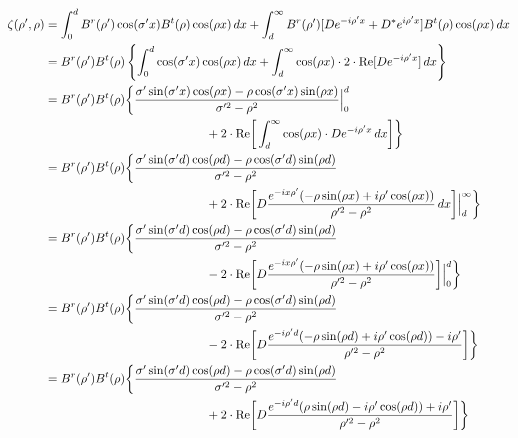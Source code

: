 \documentclass[11pt, oneside]{article}   	%
\begin{document}
\begin{align*}
\zeta(\rho ',\rho) &= \int_{0}^{d} B^{r}(\rho ')\cos(\sigma 'x) B^{t}(\rho)\cos(\rho x) \, dx + \int_{d}^{\infty} B^{r}(\rho ')[De^{-i\rho 'x} + D^{*}e^{i\rho 'x}] B^{t}(\rho)\cos(\rho x) \, dx \\
&= B^{r}(\rho ') B^{t}(\rho) \left\{ \int_{0}^{d} \cos(\sigma 'x) \cos(\rho x) \, dx + \int_{d}^{\infty} \cos(\rho x) \cdot 2 \cdot \text{Re}[De^{-i\rho 'x}] \, dx \right\} \\
&= B^{r}(\rho ') B^{t}(\rho) \bigg\{ \frac{\sigma '\sin(\sigma 'x) \cos(\rho x) - \rho\cos(\sigma 'x) \sin(\rho x)}{\sigma '^{2}-\rho^{2}} \Big|_{0}^{d}  \\
	&\hspace{132px} {} + 2 \cdot \text{Re} \bigg[  \int_{d}^{\infty} \cos(\rho x) \cdot De^{-i\rho 'x} \, dx \bigg] \bigg\} \\
&= B^{r}(\rho ') B^{t}(\rho) \bigg\{ \frac{\sigma '\sin(\sigma 'd) \cos(\rho d) - \rho\cos(\sigma 'd) \sin(\rho d)}{\sigma '^{2}-\rho^{2}} \\
	&\hspace{132px} {} + 2 \cdot \text{Re} \bigg[  D\frac{e^{-ix\rho '}(-\rho\sin(\rho x) + i\rho '\cos(\rho x))}{\rho '^{2} - \rho^{2}}  \, dx \bigg] \Big|_{d}^{\infty} \bigg\} \\
&= B^{r}(\rho ') B^{t}(\rho) \bigg\{ \frac{\sigma '\sin(\sigma 'd) \cos(\rho d) - \rho\cos(\sigma 'd) \sin(\rho d)}{\sigma '^{2}-\rho^{2}} \\
	&\hspace{132px} {} - 2 \cdot \text{Re} \bigg[  D\frac{e^{-ix\rho '}(-\rho\sin(\rho x) + i\rho '\cos(\rho x))}{\rho '^{2} - \rho^{2}} \bigg] \Big|_{0}^{d}\bigg\} \\
&= B^{r}(\rho ') B^{t}(\rho) \bigg\{ \frac{\sigma '\sin(\sigma 'd) \cos(\rho d) - \rho\cos(\sigma 'd) \sin(\rho d)}{\sigma '^{2}-\rho^{2}} \\
	&\hspace{132px} {} - 2 \cdot \text{Re} \bigg[  D\frac{e^{-i\rho 'd}(-\rho\sin(\rho d) + i\rho '\cos(\rho d)) - i\rho '}{\rho '^{2} - \rho^{2}} \bigg] \bigg\} \\
&= B^{r}(\rho ') B^{t}(\rho) \bigg\{ \frac{\sigma '\sin(\sigma 'd) \cos(\rho d) - \rho\cos(\sigma 'd) \sin(\rho d)}{\sigma '^{2}-\rho^{2}} \\
	&\hspace{132px} {} + 2 \cdot \text{Re} \bigg[  D\frac{e^{-i\rho 'd}(\rho\sin(\rho d) - i\rho '\cos(\rho d)) + i\rho '}{\rho '^{2} - \rho^{2}} \bigg] \bigg\}
\end{align*}
\end{document}
